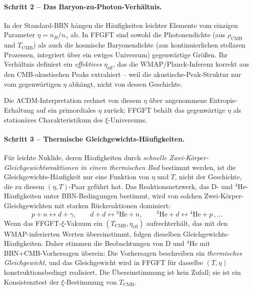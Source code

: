 \documentclass[11pt,a4paper]{article}
\begin{document}
\paragraph{Schritt 2 -- Das Baryon-zu-Photon-Verhältnis.}
In der Standard-BBN hängen die Häufigkeiten leichter Elemente vom einzigen Parameter $\eta = n_B/n_\gamma$ ab. In FFGFT sind sowohl die Photonendichte (aus $\rho_{\mathrm{CMB}}$ und $T_{\mathrm{CMB}}$) als auch die kosmische Baryonendichte (aus kontinuierlichen stellaren Prozessen, integriert über ein ewiges Universum) gegenwärtige Größen. Ihr Verhältnis definiert ein \emph{effektives} $\eta_{\mathrm{eff}}$, das die WMAP/Planck-Inferenz korrekt aus den CMB-akustischen Peaks extrahiert -- weil die akustische-Peak-Struktur nur vom gegenwärtigen $\eta$ abhängt, nicht von dessen Geschichte.

Die ΛCDM-Interpretation rechnet von diesem $\eta$ über angenommene Entropie-Erhaltung auf ein primordiales $\eta$ zurück; FFGFT behält das gegenwärtige $\eta$ als stationäres Charakteristikum des $\xi$-Universums.

\paragraph{Schritt 3 -- Thermische Gleichgewichts-Häufigkeiten.}
Für leichte Nuklide, deren Häufigkeiten durch \emph{schnelle Zwei-Körper-Gleichgewichtsreaktionen in einem thermischen Bad} bestimmt werden, ist die Gleichgewichts-Häufigkeit nur eine Funktion von $\eta$ und $T$, nicht der Geschichte, die zu diesem $(\eta, T)$-Paar geführt hat. Das Reaktionsnetzwerk, das D- und $^4$He-Häufigkeiten unter BBN-Bedingungen bestimmt, wird von solchen Zwei-Körper-Gleichgewichten mit starken Rückreaktionen dominiert:
\begin{equation}
p + n \leftrightarrow d + \gamma, \qquad d + d \leftrightarrow {}^3\text{He} + n, \qquad {}^3\text{He} + d \leftrightarrow {}^4\text{He} + p\,, \dots
\end{equation}
Wenn das FFGFT-$\xi$-Vakuum ein $(T_{\mathrm{CMB}}, \eta_{\mathrm{eff}})$ aufrechterhält, das mit den WMAP-inferierten Werten übereinstimmt, folgen dieselben Gleichgewichts-Häufigkeiten. Daher stimmen die Beobachtungen von D und $^4$He mit BBN+CMB-Vorhersagen überein: Die Vorhersagen beschreiben ein \emph{thermisches Gleichgewicht}, und das Gleichgewicht wird in FFGFT für dasselbe $(T, \eta)$ konstruktionsbedingt realisiert. Die Übereinstimmung ist kein Zufall; sie ist ein Konsistenztest der $\xi$-Bestimmung von $T_{\mathrm{CMB}}$.
\end{document}
